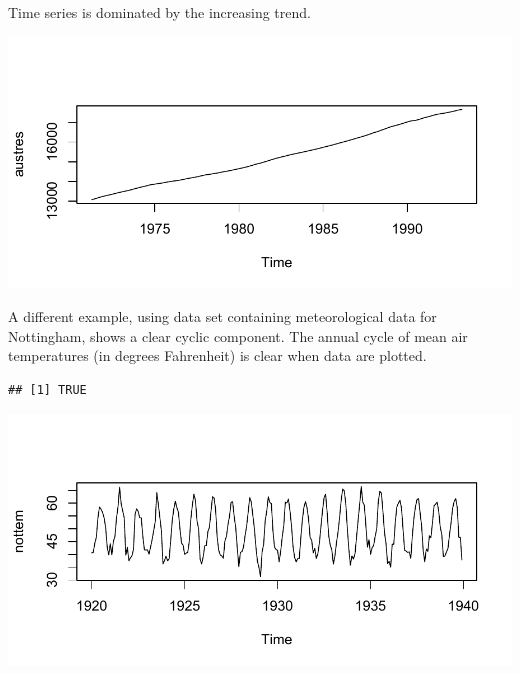 \documentclass[krantz2]{krantz}\usepackage{knitr}
\begin{document}
Time series  is dominated by the increasing trend.

\begin{knitrout}\footnotesize
{}\color{fgcolor}\begin{kframe}
\begin{alltt}
\end{alltt}
\end{kframe}

{\centering \includegraphics[width=.7\textwidth]{figure/pos-ts-02-1} 

}



\end{knitrout}

A different example, using data set   containing meteorological data for Nottingham, shows a clear cyclic component. The annual cycle of mean air temperatures (in degrees Fahrenheit) is clear when data are plotted.

\begin{knitrout}\footnotesize
{}\color{fgcolor}\begin{kframe}
\begin{alltt}
\end{alltt}
\begin{verbatim}
## [1] TRUE
\end{verbatim}
\begin{alltt}
\end{alltt}
\end{kframe}

{\centering \includegraphics[width=.7\textwidth]{figure/pos-ts-03-1} 

}



\end{knitrout}
\end{document}
